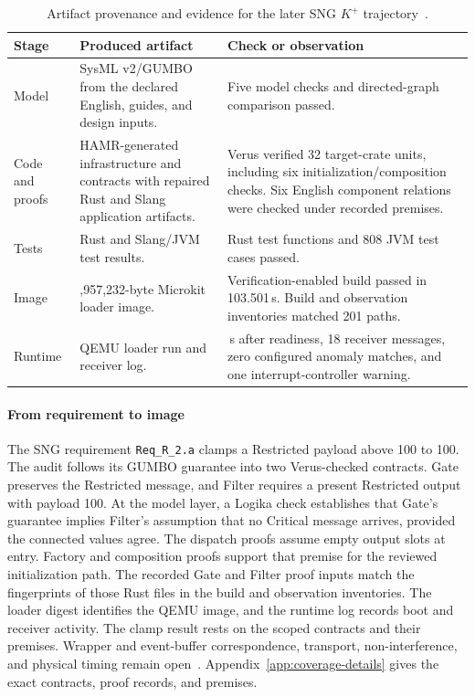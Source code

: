 \begin{table}[!htbp]
\caption{Artifact provenance and evidence for the later SNG $K^{+}$ trajectory~\cite{sngFinalReport2026}.}
\label{tab:sng-completion}
\centering\small
\begin{tabular}{@{}>{\raggedright\arraybackslash}p{.16\linewidth}>{\raggedright\arraybackslash}p{.32\linewidth}>{\raggedright\arraybackslash}p{.47\linewidth}@{}}
\toprule
Stage & Produced artifact & Check or observation \\
\midrule
Model & SysML v2/GUMBO from the declared English, guides, and design inputs. & Five model checks and directed-graph comparison passed. \\
Code and proofs & HAMR-generated infrastructure and contracts with repaired Rust and Slang application artifacts. & Verus verified 32 target-crate units, including six initialization/composition checks. Six English component relations were checked under recorded premises. \\
Tests & Rust and Slang/JVM test results. & 33 Rust test functions and 808 JVM test cases passed. \\
Image & 4,957,232-byte Microkit loader image. & Verification-enabled build passed in 103.501\,s. Build and observation inventories matched 201 paths. \\
Runtime & QEMU loader run and receiver log. & 20.033\,s after readiness, 18 receiver messages, zero configured anomaly matches, and one interrupt-controller warning. \\
\bottomrule
\end{tabular}
\end{table}

\paragraph{From requirement to image}
The SNG requirement \texttt{Req\_R\_2.a} clamps a Restricted payload above 100 to 100. The audit follows its GUMBO guarantee into two Verus-checked contracts. Gate preserves the Restricted message, and Filter requires a present Restricted output with payload 100. At the model layer, a Logika check establishes that Gate's guarantee implies Filter's assumption that no Critical message arrives, provided the connected values agree. The dispatch proofs assume empty output slots at entry. Factory and composition proofs support that premise for the reviewed initialization path. The recorded Gate and Filter proof inputs match the fingerprints of those Rust files in the build and observation inventories. The loader digest identifies the QEMU image, and the runtime log records boot and receiver activity. The clamp result rests on the scoped contracts and their premises. Wrapper and event-buffer correspondence, transport, non-interference, and physical timing remain open~\cite{microkitManual}. Appendix~\ref{app:coverage-details} gives the exact contracts, proof records, and premises.

